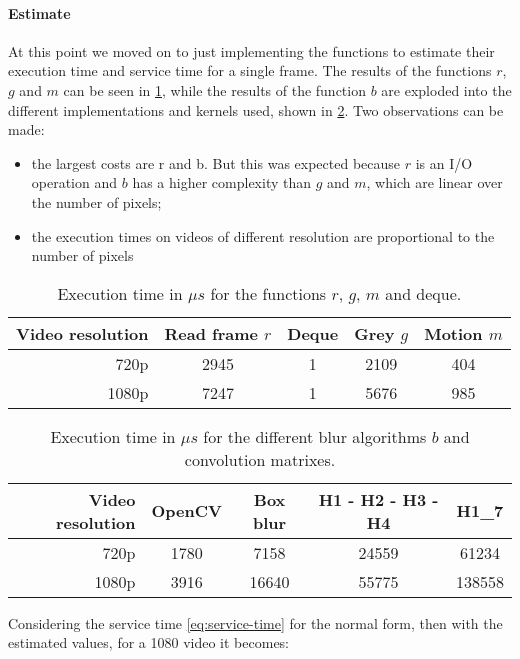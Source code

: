 \paragraph{Estimate}
At this point we moved on to just implementing the functions to estimate their execution time and service time for a single frame. The results of the functions $r$, $g$ and $m$ can be seen in \cref{table:functions}, while the results of the function $b$ are exploded into the different implementations and kernels used, shown in \cref{table:blur}.
Two observations can be made:
\begin{itemize}
    \item the largest costs are r and b. But this was expected because $r$ is an I/O operation and $b$ has a higher complexity than $g$ and $m$, which are linear over the number of pixels;
    \item the execution times on videos of different resolution are proportional to the number of pixels
\end{itemize}

\begin{table}[!h]
\centering
\begin{tabular}{rcccc}
\hline
Video resolution & Read frame $r$ & Deque & Grey $g$ & Motion $m$ \\ \hline
720p             & 2945           & 1     & 2109     & 404        \\
1080p            & 7247           & 1     & 5676     & 985        \\ \hline
\end{tabular}
\caption{Execution time in $\mu s$ for the functions $r$, $g$, $m$ and deque.}
\label{table:functions}
\end{table}

\begin{table}[h]
\centering
\begin{tabular}{rcccc}
\hline
Video resolution & OpenCV & Box blur & H1 - H2 - H3 - H4 & H1\_7   \\ \hline
720p             & 1780   & 7158     & 24559             & 61234   \\
1080p            & 3916   & 16640    & 55775             & 138558 \\ \hline
\end{tabular}
\caption{Execution time in $\mu s$ for the different blur algorithms $b$ and convolution matrixes.}
\label{table:blur}
\end{table}

Considering the service time \cref{eq:service-time} for the normal form, then with the estimated values, for a 1080 video it becomes:


